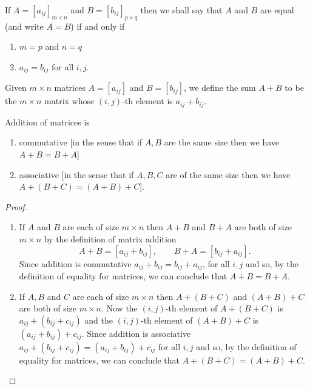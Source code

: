 \documentclass[10pt, a4paper]{article}
\begin{document}
\begin{definition}
    If $A = [a_{ij}]_{m\times n}$ and $B = [b_{ij}]_{p\times q}$ then we shall say that $A$ and $B$ are equal (and write $A = B$) if and only if
    \begin{enumerate}[label = (\arabic*)]
        \item $m = p$ and $n = q$
        \item $a_{ij} = b_{ij}$ for all $i,j$.
    \end{enumerate}
\end{definition}

\begin{definition}
    Given $m\times n$ matrices $A = [a_{ij}]$ and $B = [b_{ij}]$, we define the sum $A + B$ to be the $m\times n$ matrix whose $(i, j)$-th element is $a_{ij} + b_{ij}$.
\end{definition}

\begin{theorem}\label{thm:matr_add_comm}
    Addition of matrices is
    \begin{enumerate}[label = (\arabic*)]
        \item commutative [in the sense that if $A, B$ are the same size then we have $A + B = B + A$]
        \item associative [in the sense that if $A, B, C$ are of the same size then we have $A + (B + C) = (A + B) + C$].
    \end{enumerate}
    \begin{proof}
    \phantom{}
    \begin{enumerate}[label = (\arabic*)]
        \item If $A$ and $B$ are each of size $m\times n$ then $A + B$ and $B + A$ are both of size $m\times n$ by the definition of matrix addition
        \[
        A + B = [a_{ij} + b_{ij}],\qquad B + A = [b_{ij} + a_{ij}].
        \]
        Since addition is commutative $a_{ij} + b_{ij} = b_{ij} + a_{ij}$, for all $i, j$ and so, by the definition of equality for matrices, we can conclude that $A + B = B + A$.
        \item If $A, B$ and $C$ are each of size $m\times n$ then $A + (B + C)$ and $(A + B) + C$ are both of size $m\times n$. Now the $(i, j)$-th element of $A + (B + C)$ is $a_{ij} + (b_{ij} + c_{ij})$ and the $(i, j)$-th element of $(A + B) + C$ is $(a_{ij} + b_{ij}) + c_{ij}$. Since addition is associative $a_{ij} + (b_{ij} + c_{ij}) = (a_{ij} + b_{ij}) + c_{ij}$ for all $i, j$ and so, by the definition of equality for matrices, we can conclude that $A + (B + C) = (A + B) + C$.
    \end{enumerate}
    \end{proof}
\end{theorem}
\end{document}
